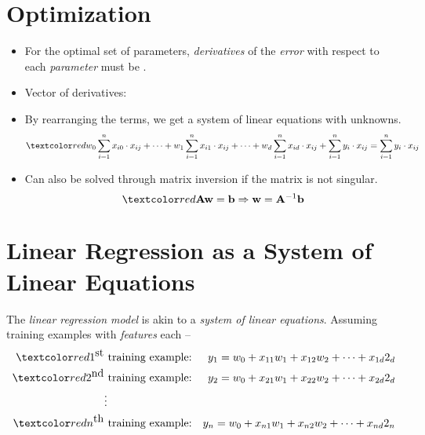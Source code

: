 \documentclass[
	number={5},
	title={Linear Regression}
]{cs584notes}
\begin{document}
\section{Optimization}\label{sec:optimization}
\begin{itemize}
	\item For the optimal set of parameters, \emph{derivatives} of the \emph{error} with respect to each \emph{parameter} must be .
	\item Vector of derivatives:
	\item By rearranging the terms, we get a system of linear equations with  unknowns.
	\[ \data{ w_{0}\sum_{i=1}^{n} x_{i0}\cdot x_{ij} + \dots + w_{1}\sum_{i=1}^{n} x_{i1}\cdot x_{ij} + \dots + w_{d}\sum_{i=1}^{n} x_{id}\cdot x_{ij} + \sum_{i=1}^{n} y_{i}\cdot x_{ij} = \sum_{i=1}^{n} y_{i}\cdot x_{ij} } \]
	\item Can also be solved through matrix inversion if the matrix is not singular.
	\[ \data{ \vec{A}\vec{w} = \vec{b} \Rightarrow \vec{w} = \vec{A}^{-1}\vec{b} } \]
\end{itemize}

\section{Linear Regression as a System of Linear Equations}\label{sec:linear-regression-as-a-system-of-linear-equations}
The \emph{linear regression model} is akin to a \emph{system of linear equations}.
Assuming  training examples with  \emph{features} each --
\begin{equation*}
\begin{aligned}
	\data{1^{\mbox{st}}} & \mbox{ training example:} & y_{1} = w_{0} + x_{11}w_{1} + x_{12}w_{2} + \dots + x_{1d}2_{d}\\
	\data{2^{\mbox{nd}}} & \mbox{ training example:} & y_{2} = w_{0} + x_{21}w_{1} + x_{22}w_{2} + \dots + x_{2d}2_{d}\\
	 & \vdots & \\
	\data{n^{\mbox{th}}} & \mbox{ training example:} & y_{n} = w_{0} + x_{n1}w_{1} + x_{n2}w_{2} + \dots + x_{nd}2_{n}\\
\end{aligned}
\end{equation*}
\end{document}
